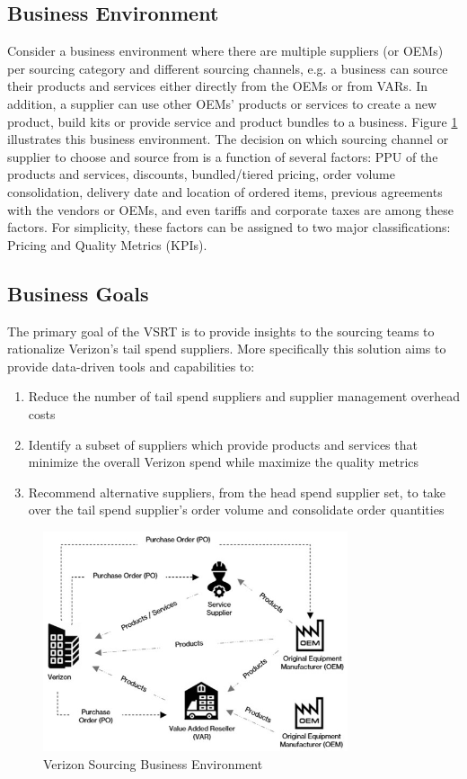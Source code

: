 \documentclass[inte,nonblindrev]{informs3} %
\begin{document}
\subsection{Business Environment}
Consider a business environment where there are multiple suppliers (or OEMs) per sourcing category and different sourcing channels, e.g. a business can source their products and services either directly from the OEMs or from VARs. In addition, a supplier can use other OEMs' products or services to create a new product, build kits or provide service and product bundles to a business. Figure \ref{fig:fig1a} illustrates this business environment. The decision on which sourcing channel or supplier to choose and source from is a function of several factors: PPU of the products and services, discounts, bundled/tiered pricing, order volume consolidation, delivery date and location of ordered items, previous agreements with the vendors or OEMs, and even tariffs and corporate taxes are among these factors. For simplicity, these factors can be assigned to two major classifications: Pricing and Quality Metrics (KPIs).

\subsection{Business Goals}
The primary goal of the VSRT is to provide insights to the sourcing teams to rationalize Verizon's tail spend suppliers. More specifically this solution aims to provide data-driven tools and capabilities to:

\begin{enumerate}
\item Reduce the number of tail spend suppliers and supplier management overhead costs
\item Identify a subset of suppliers which provide products and services that minimize the overall Verizon spend while maximize the quality metrics 
\item Recommend alternative suppliers, from the head spend supplier set, to take over the tail spend supplier's order volume and consolidate order quantities
\end{enumerate}

\begin{figure}
\includegraphics[width = 0.8\textwidth]{BusinessEnv.jpg}
\caption{Verizon Sourcing Business Environment}
\label{fig:fig1a}
\end{figure}
\end{document}
